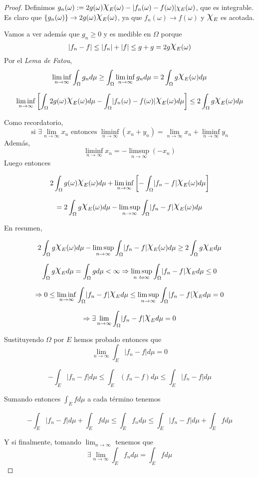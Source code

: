 \documentclass[11pt, a4paper]{article}
\providecommand{\abs}[1]{\lvert#1\rvert}
\DeclareRobustCommand{\rchi}{{\Large \mathpalette\irchi\relax}}
\newcommand{\irchi}[2]{\raisebox{0.6\depth}{$#1\chi$}} %
\theoremstyle{theorem-style}
\theoremstyle{definition-style}
\theoremstyle{remark-style}
\theoremstyle{example-style}
\begin{document}
\begin{proof}
  Definimos $g_n(\omega) := 2g(\omega)\rchi_E(\omega) - \abs{f_n(\omega) - f(\omega)} \chi_E (\omega)$, que es integrable. Es claro que $\{g_n(\omega)\} \rightarrow 2g(\omega)\rchi_E(\omega)$, ya que $f_n(\omega) \rightarrow f(\omega)$ y $\rchi_E$ es acotada.
  
  Vamos a ver además que $g_n \geq 0$ y es medible en $\Omega$ porque $$|f_n - f| \leq |f_n| + |f| \leq g + g = 2g\rchi_E(\omega)$$
  Por el \textit{Lema de Fatou}, 
  $$\liminf_{n \to \infty} \int_{\Omega} g_n d \mu \geq \int_{\Omega} \liminf_{n \to \infty} g_n d \mu = 2 \int_{\Omega} g\rchi_E(\omega)d\mu$$
  
  $$\liminf_{n \to \infty} \left[\int_{\Omega} 2g(\omega)\rchi_E(\omega) d\mu - \int_{\Omega} \abs{f_n(\omega) - f(\omega)}\rchi_E(\omega) d \mu \right] \leq 2\int_{\Omega} g\rchi_E(\omega) d \mu$$

  Como recordatorio, $$\text{si } \exists \lim_{n \to \infty} x_n \text{ entonces } \liminf_{n \to \infty} (x_n + y_n) = \lim_{n \to \infty} x_n + \liminf_{n \to \infty} y_n$$ Además, $$\liminf_{n \to \infty} x_n = - \limsup_{n \to \infty} (- x_n)$$
  Luego entonces
  
  $$2 \int_{\Omega} g(\omega)\rchi_E(\omega) d \mu + \liminf_{n \to \infty} \left[-\int_{\Omega} \abs{f_n - f} \rchi_E(\omega) d \mu \right]$$
  
  $$ = 2 \int_{\Omega} g \rchi_E(\omega) d \mu - \limsup_{n \to \infty} \int_{\Omega} \abs{f_n - f} \rchi_E(\omega) d \mu$$
  
  En resumen,
  
  $$2 \int_{\Omega} g \rchi_E(\omega) d \mu - \limsup_{n \to \infty} \int_{\Omega} \abs{f_n - f} \rchi_E(\omega) d \mu \geq 2 \int_{\Omega} g \rchi_{E} d \mu$$
  
  $$\int_{\Omega} g \rchi_{E} d \mu = \int_{\Omega} g  d \mu < \infty \Rightarrow \limsup_{n \ to \infty} \int_{\Omega} \abs{f_n - f} \rchi_E d \mu \leq 0$$
  
  $$\Rightarrow 0 \leq \liminf_{n \to \infty} \int_{\Omega} \abs{f_n - f} \rchi_E d \mu \leq \limsup_{n \to \infty} \int_{\Omega} \abs{f_n - f} \rchi_E d \mu = 0$$
  
  $$\Rightarrow \exists \lim_{n \to \infty} \int_{\Omega} \abs{f_n - f} \rchi_E d \mu = 0$$
  
  Sustituyendo $\Omega$  por $E$ hemos probado entonces que 
  $$\lim_{n \to \infty} \int_{E} \abs{f_n - f} d \mu = 0$$
  
  $$- \int_E \abs{f_n - f} d \mu \leq \int_E (f_n - f) d \mu \leq \int_E \abs{f_n - f} d \mu$$
  
  Sumando entonces $\displaystyle \int_E f d \mu$ a cada término tenemos
  
  $$ - \int_E \abs{f_n - f} d \mu + \int_E f d \mu \leq \int_E f_n d \mu \leq \int_E \abs{f_n - f} d \mu + \int_E f d \mu$$
  
  Y si finalmente, tomando $\lim_{n \to \infty}$ tenemos que
  $$ \exists \lim_{n \to \infty} \int_E f_n d \mu = \int_E f d \mu$$
\end{proof}
\end{document}
